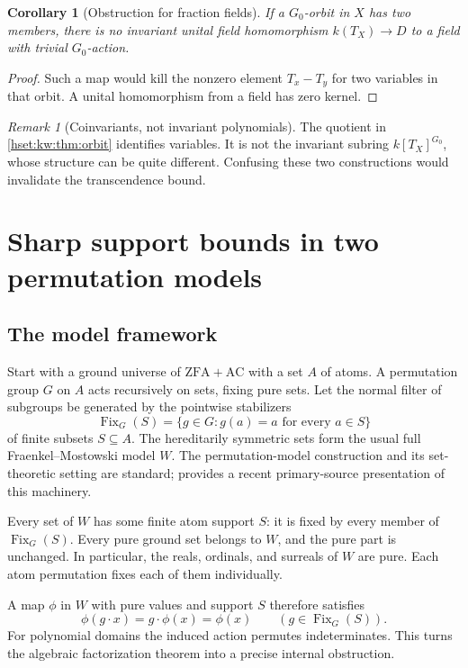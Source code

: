 \documentclass[11pt,letterpaper]{article}
\newtheorem{corollary}[corollary]{Corollary}\aliascntresetthe{corollary}
\theoremstyle{definition}
\theoremstyle{remark}
\newtheorem{remark}[remark]{Remark}\aliascntresetthe{remark}
\newcommand{\ZFA}{\mathrm{ZFA}}
\newcommand{\AC}{\mathrm{AC}}
\newcommand{\Fix}{\operatorname{Fix}}
\begin{document}
\begin{corollary}[Obstruction for fraction fields]\label{hset:kw:cor:fieldcollapse}
If a $G_0$-orbit in $X$ has two members, there is no invariant unital field homomorphism $k(T_X)\to D$ to a field with trivial $G_0$-action.
\end{corollary}
\begin{proof}
Such a map would kill the nonzero element $T_x-T_y$ for two variables in that orbit. A unital homomorphism from a field has zero kernel.
\end{proof}

\begin{remark}[Coinvariants, not invariant polynomials]
The quotient in \cref{hset:kw:thm:orbit} identifies variables. It is not the invariant subring $k[T_X]^{G_0}$, whose structure can be quite different. Confusing these two constructions would invalidate the transcendence bound.
\end{remark}

\section{Sharp support bounds in two permutation models}
\label{hset:kw:sec:fm}

\subsection{The model framework}
Start with a ground universe of $\ZFA+\AC$ with a set $A$ of atoms. A permutation group $G$ on $A$ acts recursively on sets, fixing pure sets. Let the normal filter of subgroups be generated by the pointwise stabilizers
\[
\Fix_G(S)=\{g\in G:g(a)=a\text{ for every }a\in S\}
\]
of finite subsets $S\subseteq A$. The hereditarily symmetric sets form the usual full Fraenkel--Mostowski model $W$. The permutation-model construction and its set-theoretic setting are standard; \cite[Section 3.1]{GlazerYao} provides a recent primary-source presentation of this machinery.

Every set of $W$ has some finite atom support $S$: it is fixed by every member of $\Fix_G(S)$. Every pure ground set belongs to $W$, and the pure part is unchanged. In particular, the reals, ordinals, and surreals of $W$ are pure. Each atom permutation fixes each of them individually.

A map $\phi$ in $W$ with pure values and support $S$ therefore satisfies
\begin{equation}\label{hset:kw:eq:symmetry}
\phi(g\cdot x)=g\cdot\phi(x)=\phi(x)
\qquad(g\in\Fix_G(S)).
\end{equation}
For polynomial domains the induced action permutes indeterminates. This turns the algebraic factorization theorem into a precise internal obstruction.
\end{document}
